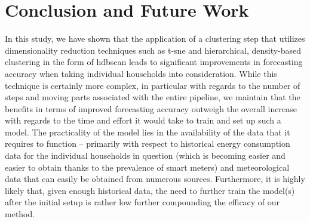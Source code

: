 \chapter{Conclusion and Future Work}
\label{ch:Conclusion-and-Future-Work}
In this study, we have shown that the application of a clustering step that utilizes dimensionality reduction techniques such as \gls{t-sne} and hierarchical, density-based clustering in the form of \gls{hdbscan} leads to significant improvements in forecasting accuracy when taking individual households into consideration. While this technique is certainly more complex, in particular with regards to the number of steps and moving parts associated with the entire pipeline, we maintain that the benefits in terms of improved forecasting accuracy outweigh the overall increase with regards to the time and effort it would take to train and set up such a model. The practicality of the model lies in the availability of the data that it requires to function -- primarily with respect to historical energy consumption data for the individual households in question (which is becoming easier and easier to obtain thanks to the prevalence of smart meters) and meteorological data that can easily be obtained from numerous sources. Furthermore, it is highly likely that, given enough historical data, the need to further train the model(s) after the initial setup is rather low further compounding the efficacy of our method.

